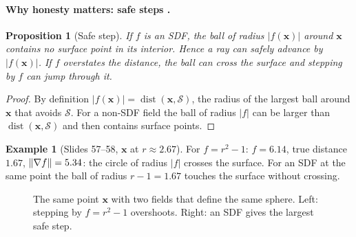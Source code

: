 \documentclass[11pt,a4paper]{article}
\newcommand{\Surf}{\mathcal{S}}
\newcommand{\vx}{\bm{x}}
\newcommand{\abs}[1]{\lvert #1\rvert}
\DeclareMathOperator{\dist}{dist}
\theoremstyle{definition}
\newtheorem{example}[definition]{Example}
\theoremstyle{plain}
\newtheorem{proposition}[definition]{Proposition}
\theoremstyle{remark}
\begin{document}
\paragraph{Why honesty matters: safe steps .}
\begin{proposition}[Safe step]
If $f$ is an SDF, the ball of radius $\abs{f(\vx)}$ around $\vx$ contains no surface point in its interior. Hence a ray can safely advance by $\abs{f(\vx)}$. If $f$ overstates the distance, the ball can cross the surface and stepping by $f$ can \emph{jump through} it.
\end{proposition}
\begin{proof}
By definition $\abs{f(\vx)}=\dist(\vx,\Surf)$, the radius of the largest ball around $\vx$ that avoids $\Surf$. For a non-SDF field the ball of radius $\abs{f}$ can be larger than $\dist(\vx,\Surf)$ and then contains surface points.
\end{proof}

\begin{example}[Slides 57--58, $\vx$ at $r\approx2.67$]
For $f=r^2-1$: $f=6.14$, true distance $1.67$, $\lVert \nabla f\rVert=5.34$: the circle of radius $\abs f$ crosses the surface. For an SDF at the same point the ball of radius $r-1=1.67$ touches the surface without crossing.
\end{example}

\begin{figure}[ht]
\centering
{}
\caption{The same point $\vx$ with two fields that define the same sphere. Left: stepping by $f=r^2-1$ overshoots. Right: an SDF gives the largest safe step.}
\end{figure}
\end{document}
